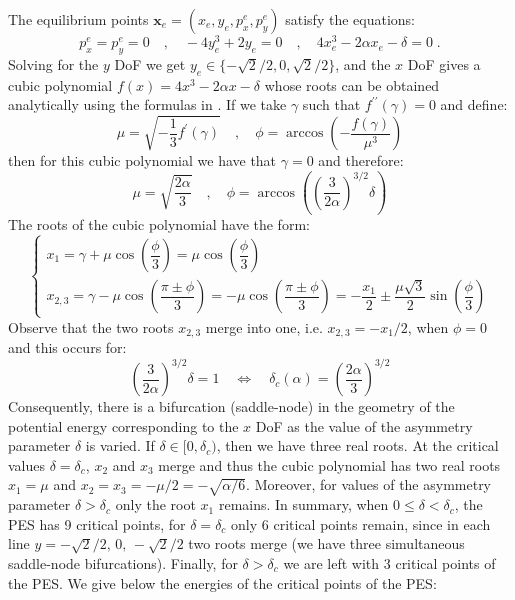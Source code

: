 \documentclass[10pt,aps,onecolumn,superscriptaddress]{revtex4-2}
\begin{document}
The equilibrium points $\mathbf{x}_e = (x_e,y_e,p_x^e,p_y^e)$ satisfy the equations:
	\begin{equation}
	p_x^e = p_y^e = 0 \quad , \quad  -4 y_e^3 + 2 y_e = 0 \quad , \quad 4 x_e^3 - 2 \alpha x_e - \delta = 0 \;.
	\end{equation}
	Solving for the $y$ DoF we get $y_e \in \lbrace -\sqrt{2}/2,0,\sqrt{2}/2 \rbrace$, and the $x$ DoF gives a cubic polynomial $f(x) = 4x^3 - 2 \alpha x - \delta$ whose roots can be obtained analytically using the formulas in \cite{brizzard2015}. If we take $\gamma$ such that $f^{\prime\prime}(\gamma) = 0$ and define:
	\begin{equation}
	\mu = \sqrt{-\frac{1}{3}f^{\prime}(\gamma)} \quad,\quad \phi = \arccos\left(-\dfrac{f(\gamma)}{\mu^3}\right)
	\label{cubic_rules}
	\end{equation}
	then for this cubic polynomial we have that $\gamma = 0$ and therefore:
	\begin{equation}
	\mu = \sqrt{\dfrac{2\alpha}{3}} \quad,\quad \phi = \arccos \left( \left(\dfrac{3}{2\alpha} \right)^{3/2} \delta \right)
	\end{equation}
	The roots of the cubic polynomial have the form:
	\begin{equation}
	\begin{cases}
	x_1 = \gamma + \mu \cos\left(\dfrac{\phi}{3}\right) = \mu \cos\left(\dfrac{\phi}{3}\right) \\[.3cm]
	x_{2,3} = \gamma - \mu \cos\left(\dfrac{\pi \pm \phi}{3}\right) = - \mu \cos\left(\dfrac{\pi \pm \phi}{3}\right) = -\dfrac{x_1}{2} \pm \dfrac{\mu\sqrt{3}}{2} \sin \left(\dfrac{\phi}{3}\right)
	\end{cases}
	\label{roots_cubic_asymm}
	\end{equation}
	Observe that the two roots $x_{2,3}$ merge into one, i.e. $x_{2,3} = -x_1/2$, when $\phi = 0$ and this occurs for:	
	\begin{equation}
	\left(\dfrac{3}{2\alpha} \right)^{3/2} \delta = 1 \quad \Leftrightarrow \quad \delta_c(\alpha) = \left(\dfrac{2\alpha}{3} \right)^{3/2}
	\label{crit_asym_uncoup}
	\end{equation}
	Consequently, there is a bifurcation (saddle-node) in the geometry of the potential energy corresponding to the $x$ DoF as the value of the asymmetry parameter $\delta$ is varied. If $\delta \in [0,\delta_c)$, then we have three real roots. At the critical values $\delta = \delta_c$, $x_2$ and $x_3$ merge and thus the cubic polynomial has two real roots $x_1 = \mu$ and $x_2 = x_3 = -\mu / 2 = -\sqrt{\alpha/6}$. Moreover, for values of the asymmetry parameter $\delta > \delta_c$ only the root $x_1$ remains. In summary, when $0 \leq \delta < \delta_c$, the PES has 9 critical points, for $\delta = \delta_c$ only 6 critical points remain, since in each line $y = -\sqrt{2}/2, \, 0, \, -\sqrt{2}/2$ two roots merge (we have three simultaneous saddle-node bifurcations). Finally, for $\delta > \delta_c$ we are left with 3 critical points of the PES. We give below the energies of the critical points of the PES:
\end{document}

